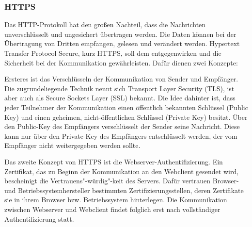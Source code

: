 \subsubsection{HTTPS}
Das HTTP-Protokoll hat den großen Nachteil, dass die Nachrichten unverschlüsselt und ungesichert übertragen werden. 
Die Daten können bei der Übertragung von Dritten empfangen, gelesen und verändert werden. Hypertext Transfer Protocol Secure, kurz HTTPS, soll dem entgegenwirken und die Sicherheit bei der Kommunikation gewährleisten. 
Dafür dienen zwei Konzepte:
\newline

\noindent
\noindent
Ersteres ist das Verschlüsseln der Kommunikation von Sender und Empfänger. Die zugrundeliegende Technik nennt sich Transport Layer Security (TLS), ist aber auch als Secure Sockets Layer (SSL) bekannt. Die Idee dahinter ist, dass jeder Teilnehmer der Kommunikation einen öffentlich bekannten Schlüssel (Public Key) und einen geheimen, nicht-öffentlichen Schlüssel (Private Key) besitzt. Über den Public-Key des Empfängers verschlüsselt der Sender seine Nachricht. Diese kann nur über den Private-Key des Empfängers entschlüsselt werden, der vom Empfänger nicht weitergegeben werden sollte.
\newline

\noindent
Das zweite Konzept von HTTPS ist die Webserver-Authentifizierung. Ein Zertifikat, das zu Beginn der Kommunikation an den Webclient gesendet wird, bescheinigt die Vertrauens"-würdig"-keit des Servers. Dafür vertrauen Browser- und Betriebssystemhersteller bestimmten Zertifizierungsstellen, deren Zertifikate sie in ihrem Browser bzw. Betriebssystem hinterlegen. Die Kommunikation zwischen Webserver und Webclient findet folglich erst nach vollständiger Authentifizierung statt.
